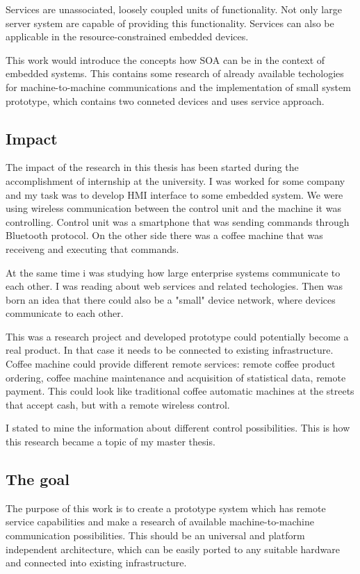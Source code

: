 Services are unassociated, loosely coupled units of functionality.
Not only large server system are capable of providing this functionality.
Services can also be applicable in the resource-constrained embedded devices.

This work would introduce the concepts how \gls{SOA} can be in the  context  of 
embedded  systems.
This contains some research of already available techologies for
machine-to-machine communications and the implementation of small system
prototype, which contains two conneted devices and uses service approach.

\subsection{Impact}
The impact of the research in this thesis has been started during the accomplishment of internship at the university. 
I was worked for some company and my task was to develop \gls{HMI} interface to some embedded system.
We were using wireless communication between the control unit and the machine it was controlling.
Control unit was a smartphone that was sending commands through Bluetooth protocol.
On the other side there was a coffee machine that was receiveng and executing that commands.

At the same time i was studying how large enterprise systems communicate to each other.
I was reading about web services and related techologies.
Then was born an idea that there could also be a "small" device network, where
devices communicate to each other.

This was a research project and developed prototype could potentially become a real product.
In that case it needs to be connected to existing infrastructure.
Coffee machine could provide different remote services: remote coffee product
ordering, coffee machine maintenance and acquisition of statistical data, remote
payment.
This could look like traditional coffee automatic machines at the streets that
accept cash, but with a remote wireless control.

I stated to mine the information about different control possibilities.
This is how this research became a topic of my master thesis. 

\subsection{The goal}

The purpose of this work is to create a prototype system which has remote
service capabilities and make a research of available machine-to-machine
communication possibilities.
This should be an universal and platform independent architecture, which can be easily ported to any suitable hardware and connected
into existing infrastructure. 

